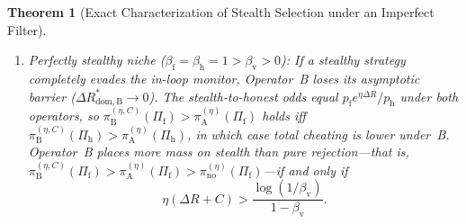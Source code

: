 \documentclass[11pt,a4paper]{article}
\newtheorem{theorem}{Theorem}
\begin{document}
\begin{theorem}[Exact Characterization of Stealth Selection under an Imperfect Filter]
\begin{enumerate}
\begin{enumerate}
\begin{equation}
    \end{equation}
    \item \emph{Perfectly stealthy niche ($\beta_{\mathrm{f}} = \beta_{\mathrm{h}} = 1 > \beta_{\mathrm{v}} > 0$):} If a stealthy strategy completely evades the in-loop monitor, Operator~B loses its asymptotic barrier ($\Delta R_{\mathrm{dom, B}}^* \to 0$). The stealth-to-honest odds equal $p_{\mathrm{f}}e^{\eta\Delta R}/p_{\mathrm{h}}$ under both operators, so $\pi_{\mathrm{B}}^{(\eta,C)}(\Pi_{\mathrm{f}}) > \pi_{\mathrm{A}}^{(\eta)}(\Pi_{\mathrm{f}})$ holds iff $\pi_{\mathrm{B}}^{(\eta,C)}(\Pi_{\mathrm{h}}) > \pi_{\mathrm{A}}^{(\eta)}(\Pi_{\mathrm{h}})$, in which case total cheating is lower under~B. Operator~B places more mass on stealth than pure rejection---that is, $\pi_{\mathrm{B}}^{(\eta, C)}(\Pi_{\mathrm{f}}) > \pi_{\mathrm{A}}^{(\eta)}(\Pi_{\mathrm{f}}) > \pi_{\mathrm{no}}^{(\eta)}(\Pi_{\mathrm{f}})$---if and only if
    \begin{equation}\label{eq:inversion}
      \eta(\Delta R + C) > \frac{\log(1/\beta_{\mathrm{v}})}{1 - \beta_{\mathrm{v}}}.
    \end{equation}
  \end{enumerate}
\end{enumerate}
\end{theorem}
\end{document}
